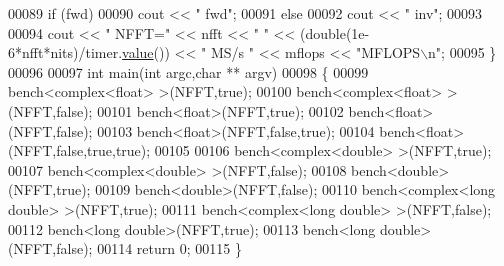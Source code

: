 \begin{DoxyCode}
00089     \textcolor{keywordflow}{if} (fwd)
00090         cout << \textcolor{stringliteral}{" fwd"};
00091     \textcolor{keywordflow}{else}
00092         cout << \textcolor{stringliteral}{" inv"};
00093 
00094     cout << \textcolor{stringliteral}{" NFFT="} << nfft << \textcolor{stringliteral}{"  "} << (double(1e-6*nfft*nits)/timer.\hyperlink{class_eigen_1_1_bench_timer_a26760f963ed8b64c126159bfea57735e}{value}()) << \textcolor{stringliteral}{" MS/s  "} << mflops 
      << \textcolor{stringliteral}{"MFLOPS\(\backslash\)n"};
00095 \}
00096 
00097 \textcolor{keywordtype}{int} main(\textcolor{keywordtype}{int} argc,\textcolor{keywordtype}{char} ** argv)
00098 \{
00099     bench<complex<float> >(NFFT,\textcolor{keyword}{true});
00100     bench<complex<float> >(NFFT,\textcolor{keyword}{false});
00101     bench<float>(NFFT,\textcolor{keyword}{true});
00102     bench<float>(NFFT,\textcolor{keyword}{false});
00103     bench<float>(NFFT,\textcolor{keyword}{false},\textcolor{keyword}{true});
00104     bench<float>(NFFT,\textcolor{keyword}{false},\textcolor{keyword}{true},\textcolor{keyword}{true});
00105 
00106     bench<complex<double> >(NFFT,\textcolor{keyword}{true});
00107     bench<complex<double> >(NFFT,\textcolor{keyword}{false});
00108     bench<double>(NFFT,\textcolor{keyword}{true});
00109     bench<double>(NFFT,\textcolor{keyword}{false});
00110     bench<complex<long double> >(NFFT,\textcolor{keyword}{true});
00111     bench<complex<long double> >(NFFT,\textcolor{keyword}{false});
00112     bench<long double>(NFFT,\textcolor{keyword}{true});
00113     bench<long double>(NFFT,\textcolor{keyword}{false});
00114     \textcolor{keywordflow}{return} 0;
00115 \}
\end{DoxyCode}
